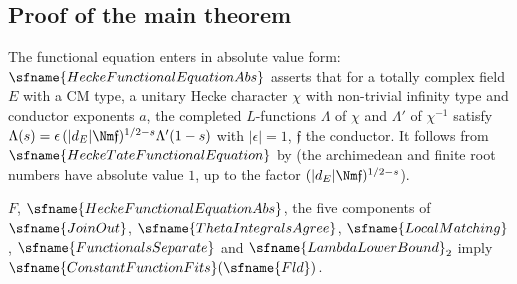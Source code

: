 \subsection{Proof of the main theorem}\label{sec:pf:fit:main}

The functional equation enters in absolute value form: $\sfname{HeckeFunctionalEquationAbs}$ asserts that for a totally
complex field $E$ with a CM type, a unitary Hecke character $\chi$ with non-trivial infinity type and conductor exponents
$a$, the completed $L$-functions $\Lambda$ of $\chi$ and $\Lambda'$ of $\chi^{-1}$ satisfy
$\Lambda(s)=\epsilon\,(|d_E|\Nm\mathfrak f)^{1/2-s}\Lambda'(1-s)$ with $|\epsilon|=1$, $\mathfrak f$ the conductor. It follows from
$\sfname{HeckeTateFunctionalEquation}$ by  (the archimedean
and finite root numbers have absolute value $1$, up to the factor $(|d_E|\Nm\mathfrak f)^{1/2-s}$).

\begin{theorem}\label{pf:fit:close}
$F$, $\sfname{HeckeFunctionalEquationAbs}$, the five components of $\sfname{JoinOut}$, $\sfname{ThetaIntegralsAgree}$,
$\sfname{LocalMatching}$, $\sfname{FunctionalsSeparate}$ and $\sfname{LambdaLowerBound}_2$ imply
$\sfname{ConstantFunctionFits}(\sfname{Fld})$.
\end{theorem}

